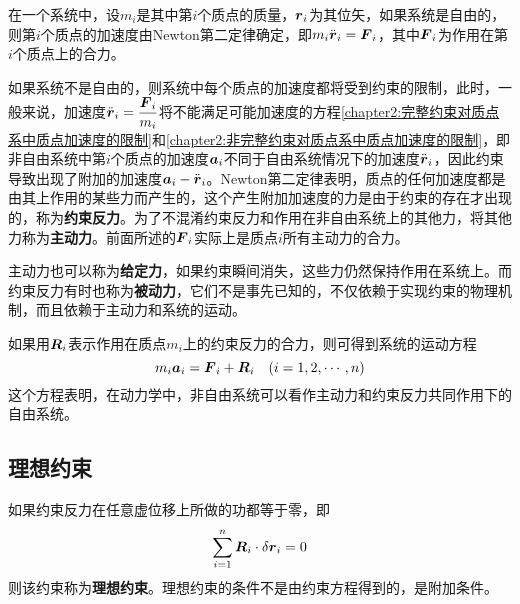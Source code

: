 在一个系统中，设$m_i$是其中第$i$个质点的质量，$\boldsymbol{r}_i$为其位矢，如果系统是自由的，则第$i$个质点的加速度由Newton第二定律确定，即$m_i\ddot{\boldsymbol{r}}_i=\boldsymbol{F}_i$，其中$\boldsymbol{F}_i$为作用在第$i$个质点上的合力。

如果系统不是自由的，则系统中每个质点的加速度都将受到约束的限制，此时，一般来说，加速度$\ddot{\boldsymbol{r}}_i=\dfrac{\boldsymbol{F}_i}{m_i}$将不能满足可能加速度的方程\eqref{chapter2:完整约束对质点系中质点加速度的限制}和\eqref{chapter2:非完整约束对质点系中质点加速度的限制}，即非自由系统中第$i$个质点的加速度$\boldsymbol{a}_i$不同于自由系统情况下的加速度$\ddot{\boldsymbol{r}}_i$，因此约束导致出现了附加的加速度$\boldsymbol{a}_i-\ddot{\boldsymbol{r}}_i$。Newton第二定律表明，质点的任何加速度都是由其上作用的某些力而产生的，这个产生附加加速度的力是由于约束的存在才出现的，称为{\bf 约束反力}。为了不混淆约束反力和作用在非自由系统上的其他力，将其他力称为{\bf 主动力}。前面所述的$\boldsymbol{F}_i$实际上是质点$i$所有主动力的合力。

主动力也可以称为{\bf 给定力}，如果约束瞬间消失，这些力仍然保持作用在系统上。而约束反力有时也称为{\bf 被动力}，它们不是事先已知的，不仅依赖于实现约束的物理机制，而且依赖于主动力和系统的运动。

如果用$\boldsymbol{R}_i$表示作用在质点$m_i$上的约束反力的合力，则可得到系统的运动方程
\begin{equation}
	m_i\boldsymbol{a}_i = \boldsymbol{F}_i+\boldsymbol{R}_i \quad (i=1,2,\cdots,n)
	\label{chapter2:非自由系统中质点的Newton第二定律方程}
\end{equation}
这个方程表明，在动力学中，非自由系统可以看作主动力和约束反力共同作用下的自由系统。

\subsection{理想约束}

如果约束反力在任意虚位移上所做的功都等于零，即
\begin{equation}
	\sum_{i=1}^n\boldsymbol{R}_i\cdot \delta\boldsymbol{r}_i = 0
\end{equation}
则该约束称为{\bf 理想约束}。理想约束的条件不是由约束方程得到的，是附加条件。

